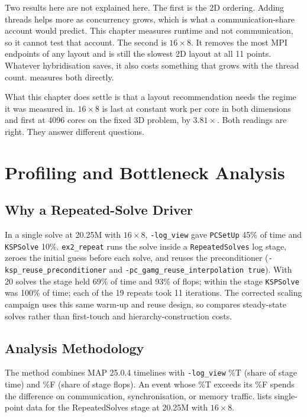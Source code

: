 \documentclass[12pt,a4paper,notitlepage]{report}
\begin{document}
Two results here are not explained here. The first is the 2D ordering. Adding threads
helps more as concurrency grows, which is what a communication-share account would
predict. This chapter measures runtime and not communication, so it cannot test that
account. The second is $16\times8$. It removes the most MPI endpoints of any layout and is
still the slowest 2D layout at all 11 points. Whatever hybridisation saves, it also costs
something that grows with the thread count.  measures both directly.

What this chapter does settle is that a layout recommendation needs the regime it was
measured in. $16\times8$ is last at constant work per core in both dimensions and first at
4096 cores on the fixed 3D problem, by $3.81\times$. Both readings are right. They answer
different questions.


\chapter{Profiling and Bottleneck Analysis}
\label{ch:profiling}
\section{Why a Repeated-Solve Driver}
\label{sec:whyrepeat}
In a single solve at 20.25M with $16\times8$, \texttt{-log\_view} gave \texttt{PCSetUp}
45\% of time and \texttt{KSPSolve} 10\%. \texttt{ex2\_repeat} runs the solve inside a
\texttt{RepeatedSolves} log stage, zeroes the initial guess before each solve, and reuses
the preconditioner (\texttt{-ksp\_reuse\_preconditioner} and
\texttt{-pc\_gamg\_reuse\_interpolation true}). With 20 solves the stage held 69\% of time
and 93\% of flops; within the stage \texttt{KSPSolve} was 100\% of time; each of the 19
repeats took 11 iterations. The corrected scaling campaign uses this same warm-up and
reuse design, so  compares steady-state solves rather than first-touch
and hierarchy-construction costs.

\section{Analysis Methodology}
\label{sec:analysis-method}
The method combines MAP 25.0.4 timelines with \texttt{-log\_view} \%T (share of stage
time) and \%F (share of stage flops). An event whose \%T exceeds its \%F spends the
difference on communication, synchronisation, or memory traffic.  lists
single-point data for the RepeatedSolves stage at 20.25M with $16\times8$.
\end{document}
